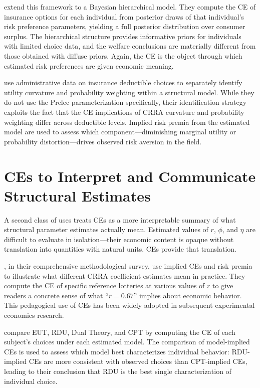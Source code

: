 \documentclass[12pt,a4paper]{article}
\begin{document}
\textcite{Gao2022} extend this framework to a Bayesian hierarchical model.
They compute the CE of insurance options for each individual from posterior
draws of that individual's risk preference parameters, yielding a full
posterior distribution over consumer surplus. The hierarchical structure
provides informative priors for individuals with limited choice data, and the
welfare conclusions are materially different from those obtained with diffuse
priors. Again, the CE is the object through which estimated risk preferences
are given economic meaning.

\textcite{Barseghyan2013} use administrative data on insurance deductible
choices to separately identify utility curvature and probability weighting
within a structural model. While they do not use the Prelec parameterization
specifically, their identification strategy exploits the fact that the CE
implications of CRRA curvature and probability weighting differ across
deductible levels. Implied risk premia from the estimated model are used to
assess which component---diminishing marginal utility or probability
distortion---drives observed risk aversion in the field.

\section{CEs to Interpret and Communicate Structural Estimates}

A second class of uses treats CEs as a more interpretable summary of what
structural parameter estimates actually mean. Estimated values of $r$, $\phi$,
and $\eta$ are difficult to evaluate in isolation---their economic content is
opaque without translation into quantities with natural units. CEs provide that
translation.

\textcite{HarrisonRutstrom2008}, in their comprehensive methodological survey,
use implied CEs and risk premia to illustrate what different CRRA coefficient
estimates mean in practice. They compute the CE of specific reference lotteries
at various values of $r$ to give readers a concrete sense of what ``$r = 0.67$''
implies about economic behavior. This pedagogical use of CEs has been widely
adopted in subsequent experimental economics research.

\textcite{HarrisonSwarthout2023} compare EUT, RDU, Dual Theory, and CPT by
computing the CE of each subject's choices under each estimated model. The
comparison of model-implied CEs is used to assess which model best
characterizes individual behavior: RDU-implied CEs are more consistent with
observed choices than CPT-implied CEs, leading to their conclusion that RDU is
the best single characterization of individual choice.
\end{document}
